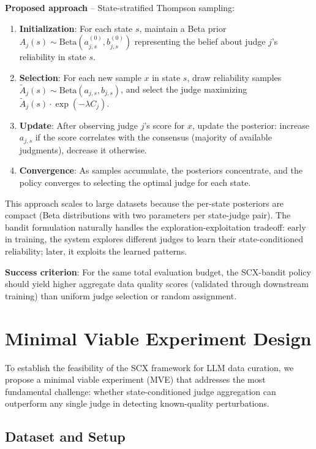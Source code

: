 \documentclass[11pt,twocolumn]{article}
\begin{document}
\textbf{Proposed approach} -- State-stratified Thompson sampling:
\begin{enumerate}
    \item \textbf{Initialization}: For each state $s$, maintain a Beta prior $A_j(s) \sim \text{Beta}(a_{j,s}^{(0)}, b_{j,s}^{(0)})$ representing the belief about judge $j$'s reliability in state $s$.
    \item \textbf{Selection}: For each new sample $x$ in state $s$, draw reliability samples $\tilde{A}_j(s) \sim \text{Beta}(a_{j,s}, b_{j,s})$, and select the judge maximizing $\tilde{A}_j(s) \cdot \exp(-\lambda C_j)$.
    \item \textbf{Update}: After observing judge $j$'s score for $x$, update the posterior: increase $a_{j,s}$ if the score correlates with the consensus (majority of available judgments), decrease it otherwise.
    \item \textbf{Convergence}: As samples accumulate, the posteriors concentrate, and the policy converges to selecting the optimal judge for each state.
\end{enumerate}

This approach scales to large datasets because the per-state posteriors are compact (Beta distributions with two parameters per state-judge pair). The bandit formulation naturally handles the exploration-exploitation tradeoff: early in training, the system explores different judges to learn their state-conditioned reliability; later, it exploits the learned patterns.

\textbf{Success criterion}: For the same total evaluation budget, the SCX-bandit policy should yield higher aggregate data quality scores (validated through downstream training) than uniform judge selection or random assignment.

\section{Minimal Viable Experiment Design}

To establish the feasibility of the SCX framework for LLM data curation, we propose a minimal viable experiment (MVE) that addresses the most fundamental challenge: whether state-conditioned judge aggregation can outperform any single judge in detecting known-quality perturbations.

\subsection{Dataset and Setup}
\end{document}
